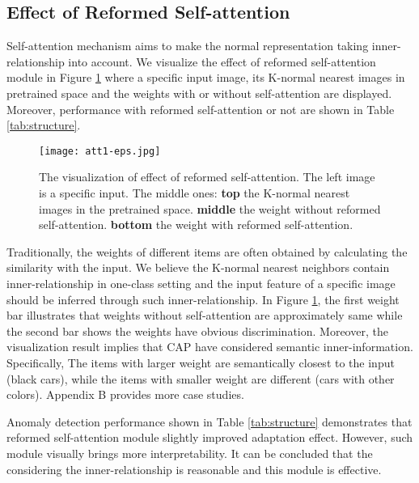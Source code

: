 \documentclass{article}
\begin{document}
\subsection{Effect of Reformed Self-attention}
\label{sec:self-attention}
Self-attention mechanism aims to make the normal representation taking inner-relationship into account. We visualize the effect of reformed self-attention module in Figure \ref{fig:att} where a specific input image, its K-normal nearest images in pretrained space and the weights with or without self-attention are displayed. Moreover, performance with reformed self-attention or not are shown in Table \ref{tab:structure}.


\begin{figure}[t]
	\centering
		\texttt{[image: att1-eps.jpg]}
	\caption{The visualization of effect of reformed self-attention. The left image is a specific input. The middle ones: \textbf{top} the K-normal nearest images in the pretrained space. \textbf{middle} the weight without reformed self-attention. \textbf{bottom} the weight with reformed self-attention.}
	\label{fig:att}
\end{figure}

Traditionally, the weights of different items are often obtained by calculating the similarity with the input. We believe the K-normal nearest neighbors contain inner-relationship in one-class setting and the input feature of a specific image should be inferred through such inner-relationship. In Figure \ref{fig:att}, the first weight bar illustrates that weights without self-attention are approximately same while the second bar shows the weights have obvious discrimination. Moreover, the visualization result implies that CAP have considered semantic inner-information. Specifically, The items with larger weight are semantically closest to the input (black cars), while the items with smaller weight are different (cars with other colors). Appendix B provides more case studies.

Anomaly detection performance shown in Table \ref{tab:structure} demonstrates that reformed self-attention module slightly improved adaptation effect. However, such module visually brings more interpretability. It can be concluded that the considering the inner-relationship is reasonable and this module is effective.



\begin{table}[t]
	\centering
	\caption{Anomaly detection performance with different K-normal nearest neighbors (Average AUROC \%).}
	\label{tab:k}
\end{table}
\end{document}
